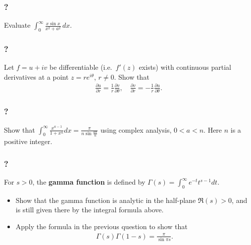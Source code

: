 \hypertarget{section-125}{%
\subsubsection{?}\label{section-125}}

Evaluate
\(\displaystyle{ \int_{0}^{\infty}\frac{x\sin x}{x^2+a^2} \, dx }\).

\hypertarget{section-126}{%
\subsubsection{?}\label{section-126}}

Let \(f=u+iv\) be differentiable (i.e.~\(f'(z)\) exists) with continuous
partial derivatives at a point \(z=re^{i\theta}\), \(r\not= 0\). Show
that
\begin{align*}\frac{\partial u}{\partial r}=\frac{1}{r}\frac{\partial v}{\partial \theta},\quad
\frac{\partial v}{\partial r}=-\frac{1}{r}\frac{\partial u}{\partial \theta}.\end{align*}

\hypertarget{section-127}{%
\subsubsection{?}\label{section-127}}

Show that
\(\displaystyle \int_0^\infty \frac{x^{a-1}}{1+x^n} dx=\frac{\pi}{n\sin \frac{a\pi}{n}}\)
using complex analysis, \(0< a < n\). Here \(n\) is a positive integer.

\hypertarget{section-128}{%
\subsubsection{?}\label{section-128}}

For \(s>0\), the \textbf{gamma function} is defined by
\(\displaystyle{\Gamma(s)=\int_0^{\infty} e^{-t}t^{s-1} dt}\).

\begin{itemize}
\item
  Show that the gamma function is analytic in the half-plane
  \(\Re (s)>0\), and is still given there by the integral formula above.
\item
  Apply the formula in the previous question to show that
  \begin{align*}\Gamma(s)\Gamma(1-s)=\frac{\pi}{\sin \pi s}.\end{align*}
\end{itemize}


